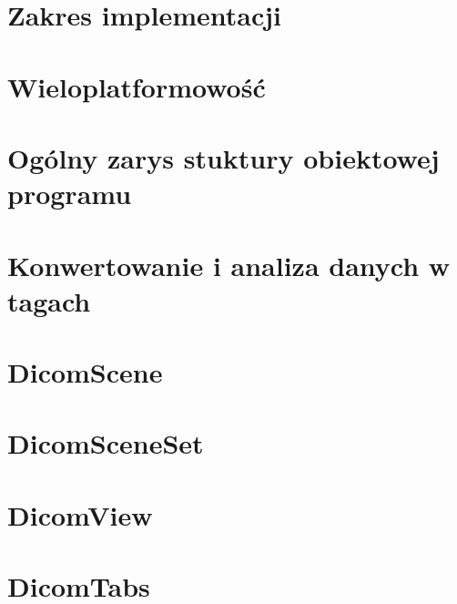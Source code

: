 

\section{Zakres implementacji}


\section{Wieloplatformowość}


\section{Ogólny zarys stuktury obiektowej programu}


\section{Konwertowanie i analiza danych w tagach}


\section{DicomScene}


\section{DicomSceneSet}


\section{DicomView}


\section{DicomTabs}

